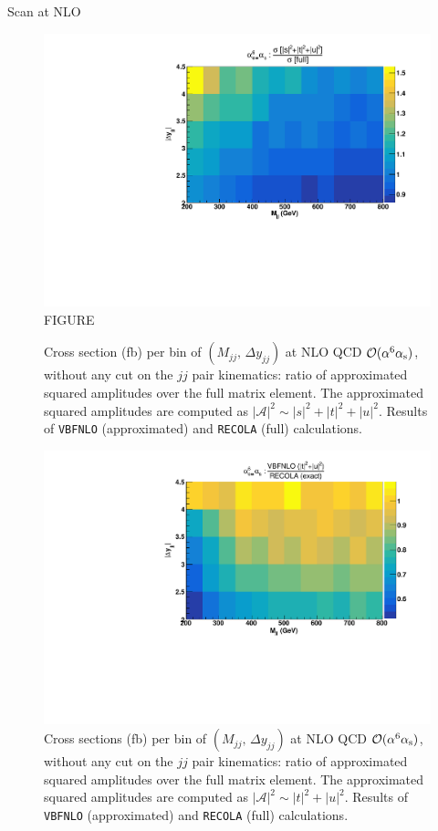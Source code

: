 Scan at NLO

\begin{figure}[hbt]
\centering
\includegraphics[scale=0.39]{figures/scanfigures/a6as_vbfnloVSrecola_stu.pdf}
FIGURE
\caption{Cross section (fb) per bin of $(M_{jj},\,\Delta y_{jj})$ at NLO QCD $\mathcal{O}(\alpha^6\alpha_\text{s})$, without any cut on the $jj$ pair kinematics:  ratio of approximated squared amplitudes over the full matrix element. The approximated squared amplitudes are computed as $|\mathcal{A}|^2 \sim |s|^2 + |t|^2 + |u|^2$. Results of \texttt{VBFNLO} (approximated) and \texttt{RECOLA} (full) calculations.}\label{fig:mjjdyjj_2d_NLO}
\end{figure}


\begin{figure}[hbt]
\centering
\includegraphics[scale=0.395]{figures/scanfigures/a6as_vbfnloVSrecola_tu.pdf}
\caption{Cross sections (fb) per bin of $(M_{jj},\,\Delta y_{jj})$ at NLO QCD $\mathcal{O}(\alpha^6\alpha_\text{s})$, without any cut on the $jj$ pair kinematics: ratio of approximated squared amplitudes over the full matrix element. The approximated squared amplitudes are computed as $|\mathcal{A}|^2 \sim |t|^2 + |u|^2$. Results of \texttt{VBFNLO} (approximated) and \texttt{RECOLA} (full) calculations.}\label{fig:ratio2d_NLO}
\end{figure}